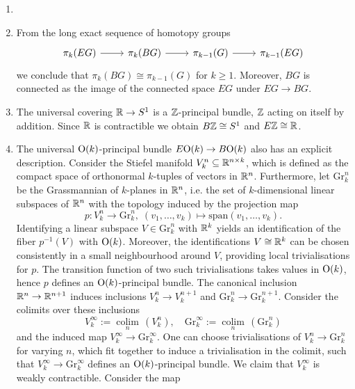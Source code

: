 \begin{example}
    \label{bundles:ex:examples_for_classifiying_spaces}
    \begin{enumerate}[label=(\roman*)]
        \item[]
        \item \vspace{-.5em}\label{bundles:ex:homotopy_groups_of_BG} From the long exact sequence of homotopy groups 
        \[\begin{tikzcd}
        {\pi_k(EG)} & {\pi_k(BG)} & {\pi_{k-1}(G)} & {\pi_{k-1}(EG)}
        \arrow[from=1-1, to=1-2]
        \arrow[from=1-2, to=1-3]
        \arrow[from=1-3, to=1-4]
        \end{tikzcd}\]
        we conclude that $\pi_k(BG) \cong \pi_{k-1}(G)$ for $k \geq 1$. Moreover, $BG$ is connected as the image of the connected space $EG$ under $EG \to BG$.
        \item The universal covering $\mathbb{R} \to S^1$ is a $\mathbb{Z}$-principal bundle, $\mathbb{Z}$ acting on itself by addition. Since $\mathbb{R}$ is contractible we obtain $B\mathbb{Z} \cong S^1$ and $E\mathbb{Z} \cong \mathbb{R}$.
        \item The universal $\mathrm{O}(k)$-principal bundle $E\mathrm{O}(k) \to B\mathrm{O}(k)$ also has an explicit description. Consider the Stiefel manifold $V_k^n \subseteq \mathbb{R}^{n\times k}$, which is defined as the compact space of orthonormal $k$-tuples of vectors in $\mathbb{R}^n$. Furthermore, let $\mathrm{Gr}_k^n$ be the Grassmannian of $k$-planes in $\mathbb{R}^n$, i.e. the set of $k$-dimensional linear subspaces of $\mathbb{R}^n$ with the topology induced by the projection map
        \[
        p \colon V_k^n \to \mathrm{Gr}_k^n, \; (v_1,\ldots,v_k) \mapsto \mathrm{span}(v_1,\ldots,v_k).
        \] 
        Identifying a linear subspace $V \in \mathrm{Gr}_k^n$ with $\mathbb{R}^k$ yields an identification of the fiber $p^{-1}(V)$ with $\mathrm{O}(k)$. Moreover, the identifications $V \cong \mathbb{R}^k$ can be chosen consistently in a small neighbourhood around $V$, providing local trivialisations for $p$. The transition function of two such trivialisations takes values in $\mathrm{O}(k)$, hence $p$ defines an $\mathrm{O}(k)$-principal bundle.
        The canonical inclusion $\mathbb{R}^n \to \mathbb{R}^{n+1}$ induces inclusions $V_k^n \to V_k^{n+1}$ and $\mathrm{Gr}_k^n \to \mathrm{Gr}_k^{n+1}$. Consider the colimits over these inclusions 
        \[
        V_k^\infty := \operatorname*{colim}_n\,(V_k^n), \quad \mathrm{Gr}_k^\infty := \operatorname*{colim}_n\,(\mathrm{Gr}_k^n)
        \] 
        and the induced map $V_k^\infty \to \mathrm{Gr}_k^\infty$. One can choose trivialisations of $V_k^n \to \mathrm{Gr}_k^n$ for varying $n$, which fit together to induce a trivialisation in the colimit, such that \linebreak $V_k^\infty \to \mathrm{Gr}_k^\infty$ defines an $\mathrm{O}(k)$-principal bundle. We claim that $V_k^\infty$ is weakly contractible. Consider the map 

\end{enumerate}
\end{example}
